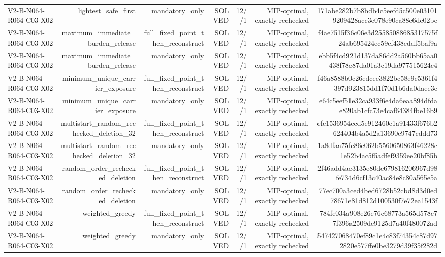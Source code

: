 {\begin{longtable}{lrrrrrr}
V2-B-N064-R064-C03-X02 & lightest\_safe\_first & mandatory\_only & SOLVED & 12//1 & MIP-optimal, exactly rechecked & 171abe282b7b8bdb4c5eefd5c500e031019209428acc3e078e90ca88e6de02be \\
V2-B-N064-R064-C03-X02 & maximum\_immediate\_burden\_release & full\_fixed\_point\_then\_reconstruct & SOLVED & 12//1 & MIP-optimal, exactly rechecked & f4ae7515f36c06e3d25585088685317575f24ab695424ec59ef438eddf5baf9a \\
V2-B-N064-R064-C03-X02 & maximum\_immediate\_burden\_release & mandatory\_only & SOLVED & 12//1 & MIP-optimal, exactly rechecked & ebb5f4cd921d137da86dd2a560bb65aa0438f78e87da01a3c19da977515624c4 \\
V2-B-N064-R064-C03-X02 & minimum\_unique\_carrier\_exposure & full\_fixed\_point\_then\_reconstruct & SOLVED & 12//1 & MIP-optimal, exactly rechecked & f46a8588b0c26edcee3822bc58e9c5361f4397d923815dd1f70d1b6da0daee3e \\
V2-B-N064-R064-C03-X02 & minimum\_unique\_carrier\_exposure & mandatory\_only & SOLVED & 12//1 & MIP-optimal, exactly rechecked & e64c5eef51e32ca933f6e4da6eaa894dfdae820ab1cfc73e4caf64384fbe16b9 \\
V2-B-N064-R064-C03-X02 & multistart\_random\_rechecked\_deletion\_32 & full\_fixed\_point\_then\_reconstruct & SOLVED & 12//1 & MIP-optimal, exactly rechecked & efc1536954ccd5e912460e1a91433f676b2624404b4a5d2a13690e9747cddd73 \\
V2-B-N064-R064-C03-X02 & multistart\_random\_rechecked\_deletion\_32 & mandatory\_only & SOLVED & 12//1 & MIP-optimal, exactly rechecked & 1a8dfaa75fc86e062b5560650863f46228c1e52b4ac5f5adfef9359ee20bf85b \\
V2-B-N064-R064-C03-X02 & random\_order\_rechecked\_deletion & full\_fixed\_point\_then\_reconstruct & SOLVED & 12//1 & MIP-optimal, exactly rechecked & 2f46add4ae3135e80de679816206967d98fe734d6cf13c40ac84e8c80a565e5a \\
V2-B-N064-R064-C03-X02 & random\_order\_rechecked\_deletion & mandatory\_only & SOLVED & 12//1 & MIP-optimal, exactly rechecked & 77ec700a3ced4bed6728b52cbd8d3d0ed78671e81d812d100530f7e72ea1543f \\
V2-B-N064-R064-C03-X02 & weighted\_greedy & full\_fixed\_point\_then\_reconstruct & SOLVED & 12//1 & MIP-optimal, exactly rechecked & 784fe034a908e26e76c68773a565d578c77f396a2509de9125d7a40f480072ad \\
V2-B-N064-R064-C03-X02 & weighted\_greedy & mandatory\_only & SOLVED & 12//1 & MIP-optimal, exactly rechecked & 547427068470ef89c1e4c83f74354c87d972820e577ffe0be3279d39f35f282d \\

\end{longtable}}
